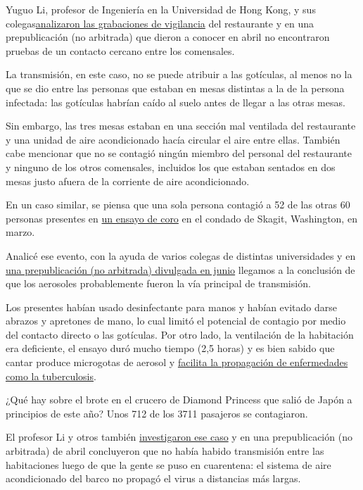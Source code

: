 Yuguo Li, profesor de Ingeniería en la Universidad de Hong Kong, y sus
colegas\href{https://www.medrxiv.org/content/10.1101/2020.04.16.20067728v1}{analizaron
las grabaciones de vigilancia} del restaurante y en una prepublicación
(no arbitrada) que dieron a conocer en abril no encontraron pruebas de
un contacto cercano entre los comensales.

La transmisión, en este caso, no se puede atribuir a las gotículas, al
menos no la que se dio entre las personas que estaban en mesas distintas
a la de la persona infectada: las gotículas habrían caído al suelo antes
de llegar a las otras mesas.

Sin embargo, las tres mesas estaban en una sección mal ventilada del
restaurante y una unidad de aire acondicionado hacía circular el aire
entre ellas. También cabe mencionar que no se contagió ningún miembro
del personal del restaurante y ninguno de los otros comensales,
incluidos los que estaban sentados en dos mesas justo afuera de la
corriente de aire acondicionado.

En un caso similar, se piensa que una sola persona contagió a 52 de las
otras 60 personas presentes en
\href{https://www.nytimes.com/2020/05/12/health/coronavirus-choir.html}{un
ensayo de coro} en el condado de Skagit, Washington, en marzo.

Analicé ese evento, con la ayuda de varios colegas de distintas
universidades y en
\href{https://www.medrxiv.org/content/10.1101/2020.06.15.20132027v2}{una
prepublicación (no arbitrada) divulgada en junio} llegamos a la
conclusión de que los aerosoles probablemente fueron la vía principal de
transmisión.

Los presentes habían usado desinfectante para manos y habían evitado
darse abrazos y apretones de mano, lo cual limitó el potencial de
contagio por medio del contacto directo o las gotículas. Por otro lado,
la ventilación de la habitación era deficiente, el ensayo duró mucho
tiempo (2,5 horas) y es bien sabido que cantar produce microgotas de
aerosol y
\href{https://www.atsjournals.org/doi/abs/10.1164/arrd.1968.98.2.297}{facilita
la propagación de enfermedades como la tuberculosis}.

¿Qué hay sobre el brote en el crucero de Diamond Princess que salió de
Japón a principios de este año? Unos 712 de los 3711 pasajeros se
contagiaron.

El profesor Li y otros también
\href{https://www.medrxiv.org/content/10.1101/2020.04.09.20059113v1}{investigaron
ese caso} y en una prepublicación (no arbitrada) de abril concluyeron
que no había habido transmisión entre las habitaciones luego de que la
gente se puso en cuarentena: el sistema de aire acondicionado del barco
no propagó el virus a distancias más largas.

